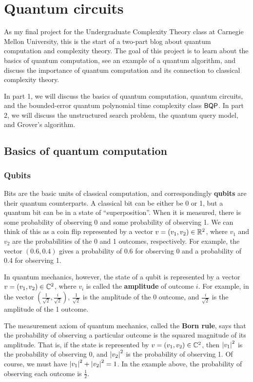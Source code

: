 \documentclass[a4paper,draft]{article}
\begin{document}
\section{Quantum circuits}

As my final project for the Undergraduate Complexity Theory class at
Carnegie Mellon University, this is the start of a two-part blog about
quantum computation and complexity theory. The goal of this project is to
learn about the basics of quantum computation, see an example of a quantum
algorithm, and discuss the importance of quantum computation and its
connection to classical complexity theory.

In part 1, we will discuss the basics of quantum computation, quantum
circuits, and the bounded-error quantum polynomial time complexity class
$\operatorname{\mathsf{BQP}}$. In part 2, we will discuss the unstructured search problem, the
quantum query model, and Grover's algorithm.

\subsection{Basics of quantum computation}

\subsubsection*{Qubits}

Bits are the basic units of classical computation, and correspondingly
\textbf{qubits} are their quantum counterparts. A classical bit can be
either be 0 or 1, but a quantum bit can be in a state of
``superposition''. When it is measured, there is some probability of
observing 0 and some probability of observing 1. We can think of this as a
coin flip represented by a vector $v = (v_1, v_2) \in \mathbb{R}^2$, where $v_1$
and $v_2$ are the probabilities of the 0 and 1 outcomes, respectively. For
example, the vector $(0.6, 0.4)$ gives a probability of 0.6 for observing
0 and a probability of 0.4 for observing 1.

In quantum mechanics, however, the state of a qubit is represented by a
vector $v = (v_1, v_2) \in \mathbb{C}^2$, where $v_i$ is called the
\textbf{amplitude} of outcome $i$. For example, in the vector $(
\frac{1}{\sqrt{2}}, \frac{i}{\sqrt{2}} )$, $\frac{1}{\sqrt{2}}$ is the
amplitude of the 0 outcome, and $\frac{i}{\sqrt{2}}$ is the amplitude of
the 1 outcome.

The measurement axiom of quantum mechanics, called the \textbf{Born rule},
says that the probability of observing a particular outcome is the squared
magnitude of its amplitude. That is, if the state is represented by $v =
(v_1, v_2) \in \mathbb{C}^2$, then $\left\lvert v_1\right\rvert^2$ is the probability of observing
0, and $\left\lvert v_2\right\rvert^2$ is the probability of observing 1. Of course, we must
have $\left\lvert v_1\right\rvert^2 + \left\lvert v_2\right\rvert^2 = 1$. In the example above, the
probability of observing each outcome is $\frac{1}{2}$.
\end{document}
